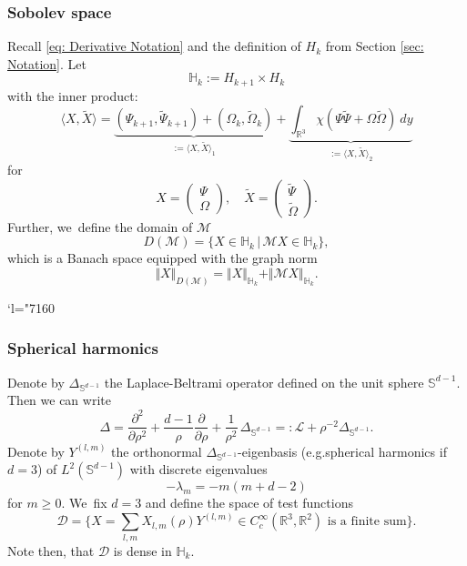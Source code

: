 \documentclass[10pt]{article}
\newcommand{\eg}{e.g.}
\newcommand{\Changel}{\mathcode`l="7160}
\theoremstyle{plain}
\theoremstyle{definition}
\begin{document}
\subsubsection*{Sobolev space}
Recall \eqref{eq: Derivative Notation} and the definition of $H_k$ from Section \ref{sec: Notation}. Let\vspace*{-3pt}
\begin{equation}
\label{eq: Sobolev Space}
\mathbb H_{k}:= H_{k+1}\times H_k
\end{equation}
with the inner product:\vspace*{-3pt}
\begin{equation}
\label{eq: Principal Part}
\langle X,\tilde X\rangle=\underbrace{(\Psi_{k+1},\tilde \Psi_{k+1})+(\Omega_k,\tilde \Omega_k)}_{:=\langle X,\tilde X\rangle_1}+\underbrace{\int_{\mathbb R^3} \chi(\Psi \tilde \Psi +\Omega\tilde \Omega)\ dy}_{:=\langle X,\tilde X\rangle_2}
\end{equation}
for\vspace*{-3pt}
\[
X=\begin{pmatrix} \Psi\\\Omega\end{pmatrix},\quad \tilde X=\begin{pmatrix} \tilde\Psi\\\tilde\Omega\end{pmatrix}.
\]
Further, we~define the domain of $\mathcal M$
\[
D(\mathcal M)=\{X\in\mathbb H_k\,|\, \mathcal M X\in\mathbb H_k\},
\]
which is a Banach space equipped with the graph norm
\[
\Vert X\Vert_{D(\mathcal M)}=\Vert X\Vert_{\mathbb H_k}+\Vert \mathcal MX\Vert_{\mathbb H_k}.
\]

\Changel

\subsubsection*{Spherical harmonics}
Denote by $\Delta_{\mathbb S^{d-1}}$ the Laplace-Beltrami operator defined on the unit sphere $\mathbb S^{d-1}$. Then we can write
\begin{equation}
\label{eq: SH}
\Delta=\frac{\partial^2}{\partial\rho^2}+\frac{d-1}{\rho}\frac{\partial}{\partial\rho}+\frac{1}{\rho^2}\, \Delta_{\mathbb S^{d-1}}=: \mathcal L+\rho^{-2}\Delta_{\mathbb S^{d-1}}.
\end{equation}
Denote by $Y^{(l,m)}$ the orthonormal $\Delta_{\mathbb S^{d-1}}$-eigenbasis (\eg spherical harmonics if $d=3$) of $L^2(\mathbb S^{d-1})$ with discrete eigenvalues
\begin{equation}
\label{eq: Eigenvalue SH}
-\lambda_m=-m(m+d-2)
\end{equation}
for $m\ge0$. We~fix $d=3$ and define the space of test functions
\[
\mathcal D = \textstyle\big\{X=\sum_{l,m} X_{l,m}(\rho)Y^{(l,m)} \in C_c^\infty(\mathbb R^3,\mathbb R^2)\text{ is a finite sum}\big\}.
\]
Note then, that $\mathcal D$ is dense in $\mathbb H_k$.
\end{document}
